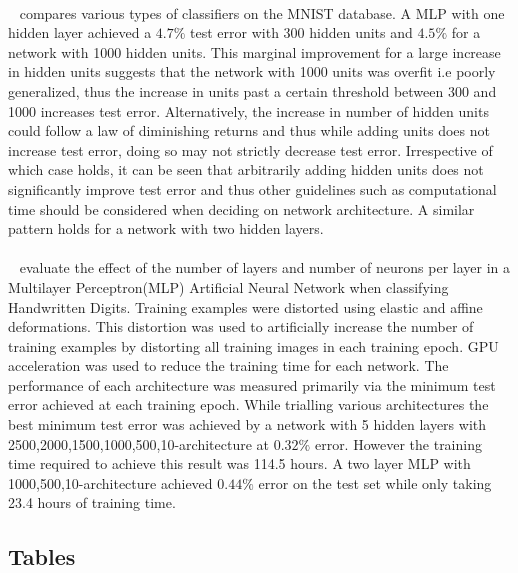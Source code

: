 \documentclass{article}
\begin{document}
\paragraph{} ~\citet{lecun1998gradient} compares various types of classifiers on the MNIST database. A MLP with one hidden layer achieved a $4.7\%$ test error with 300 hidden units and $4.5\%$ for a network with 1000 hidden units. This marginal improvement for a large increase in hidden units suggests that the network with 1000 units was overfit i.e poorly generalized, thus the increase in units past a certain threshold between 300 and 1000 increases test error. Alternatively, the increase in number of hidden units could follow a law of diminishing returns and thus while adding units does not increase test error, doing so may not strictly decrease test error. Irrespective of which case holds, it can be seen that arbitrarily adding hidden units does not significantly improve test error and thus other guidelines such as computational time should be considered when deciding on network architecture. A similar pattern holds for a network with two hidden layers.

\paragraph{}~\citet{deepsimpleMLP} evaluate the effect of the number of layers and number of neurons per layer in a Multilayer Perceptron(MLP) Artificial Neural Network when classifying Handwritten Digits. Training examples were distorted using elastic and affine deformations. This distortion was used to artificially increase the number of training examples by distorting all training images in each training epoch. GPU acceleration was used to reduce the training time for each network. The performance of each architecture was measured primarily via the minimum test error achieved at each training epoch. While trialling various architectures the best minimum test error was achieved by a network with 5 hidden layers with 2500,2000,1500,1000,500,10-architecture at $0.32\%$ error. However the training time required to achieve this result was 114.5 hours. A two layer MLP with 1000,500,10-architecture achieved $0.44\%$ error on the test set while only taking 23.4 hours of training time. 

\subsection{Tables}
\end{document}
